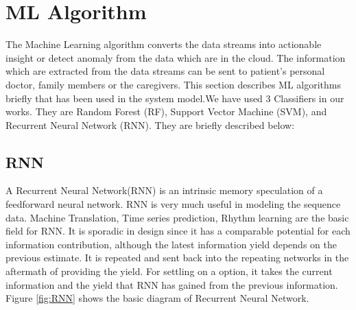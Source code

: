 




\section{ML Algorithm}
The Machine Learning algorithm converts the data streams into actionable insight or detect anomaly from the data which are in the cloud. The information which are extracted from the data streams can be sent to patient's personal doctor, family members or the caregivers. This section describes ML algorithms briefly that has been used in the system model.We have used 3 Classifiers in our works. They are Random Forest (RF), Support Vector Machine (SVM), and Recurrent Neural Network (RNN). They are briefly described below: 

\subsection{RNN}
A Recurrent Neural Network(RNN) is an intrinsic
memory speculation of a feedforward neural network. RNN is very much useful in modeling the sequence data. Machine Translation, Time series prediction, Rhythm learning are the basic field for RNN.  It is sporadic in design since it has a comparable potential for each information contribution, although the latest information yield depends on the previous estimate. It is repeated and sent back into the
repeating networks in the aftermath of providing the yield. For settling on a option, it takes the current information and the yield that RNN has gained from the previous information. Figure \ref{fig:RNN} shows the basic diagram of Recurrent Neural Network.

